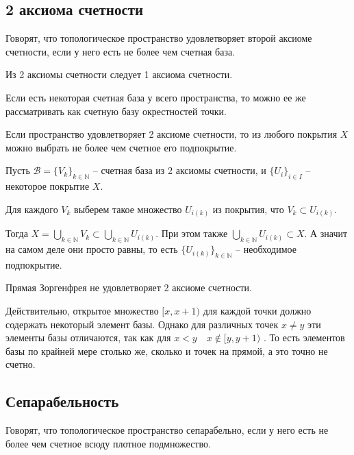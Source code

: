 \subsection{2 аксиома счетности}
\begin{Def}
    Говорят, что топологическое пространство \topX удовлетворяет второй аксиоме счетности, если у него есть не более чем счетная база.
\end{Def}

\begin{Lem}
    Из 2 аксиомы счетности следует 1 аксиома счетности.
\end{Lem}
\begin{Proof}
    Если есть некоторая счетная база у всего пространства, то можно ее же рассматривать как счетную базу окрестностей точки. 
\end{Proof}

    
\begin{Th}
    [Линделефа]
    Если пространство \topX удовлетворяет 2 аксиоме счетности, то из любого покрытия $X$ можно выбрать не более чем счетное его подпокрытие.
\end{Th}
\begin{Proof}
    Пусть $\mathcal{B} = \{V_k\}_{k\in\mathbb{N}}$ -- счетная база из 2 аксиомы счетности, и $\{U_i\}_{i\in I}$ -- некоторое покрытие $X $.

    Для каждого $V_k$ выберем такое множество $U_{i(k)}$ из покрытия, что $V_k \subset U_{i(k)}$. 

    Тогда $X = \bigcup\limits_{k \in \mathbb{N}} V_k \subset \bigcup\limits_{k \in \mathbb{N}} U_{i(k)}$. При этом также $\bigcup\limits_{k \in \mathbb{N}} U_{i(k)} \subset X $. А значит на самом деле они просто равны, то есть $\{ U_{i(k)} \}_{k\in \mathbb{N}}$ -- необходимое подпокрытие.
\end{Proof}

\begin{Ex}
    Прямая Зоргенфрея не удовлетворяет 2 аксиоме счетности.

    Действительно, открытое множество $[x, x+1)$ для каждой точки должно содержать некоторый элемент базы. Однако для различных точек  $x\neq y$ эти элементы базы отличаются, так как для $x<y \quad x \notin [y, y+1)$ . То есть элементов базы по крайней мере столько же, сколько и точек на прямой, а это точно не счетно.
\end{Ex}

\subsection{Сепарабельность}
\begin{Def}
    Говорят, что топологическое пространство \topX сепарабельно, если у него есть не более чем счетное всюду плотное подмножество.
\end{Def}


